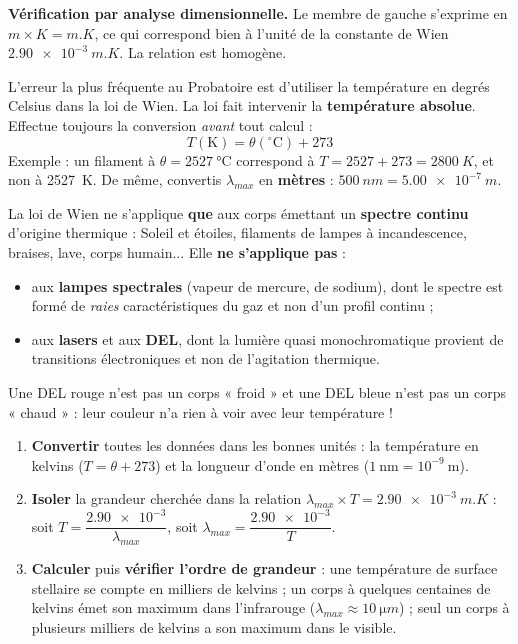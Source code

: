 \documentclass[11pt]{article}
\newcounter{popsec}
\newcounter{popsub}
\newcommand{\courssub}[1]{%
  \stepcounter{popsub}%
  \par\vspace{9pt}\noindent{\popxbold\fontsize{11.5}{13}\selectfont\color{popink}{\color{poporange}\thepopsec.\thepopsub}\hspace{6pt}#1}\par\nopagebreak\vspace{4pt}
}
\begin{document}
\textbf{Vérification par analyse dimensionnelle.} Le membre de gauche s'exprime en $\si{m} \times \si{K} = \si{m.K}$, ce qui correspond bien à l'unité de la constante de Wien $\num{2,90e-3}\ \si{m.K}$. La relation est homogène.

\begin{attention}
L'erreur la plus fréquente au Probatoire est d'utiliser la température en degrés Celsius dans la loi de Wien. La loi fait intervenir la \textbf{température absolue}. Effectue toujours la conversion \emph{avant} tout calcul :
\[ T(\text{K}) = \theta(^\circ\text{C}) + 273 \]
Exemple : un filament à $\theta = \SI{2527}{\celsius}$ correspond à $T = 2527 + 273 = \SI{2800}{K}$, et non à \SI{2527}{K}. De même, convertis $\lambda_{max}$ en \textbf{mètres} : $\SI{500}{nm} = \num{5,00e-7}\ \si{m}$.
\end{attention}

\begin{attention}
La loi de Wien ne s'applique \textbf{que} aux corps émettant un \textbf{spectre continu} d'origine thermique : Soleil et étoiles, filaments de lampes à incandescence, braises, lave, corps humain... Elle \textbf{ne s'applique pas} :
\begin{itemize}
\item aux \textbf{lampes spectrales} (vapeur de mercure, de sodium), dont le spectre est formé de \emph{raies} caractéristiques du gaz et non d'un profil continu ;
\item aux \textbf{lasers} et aux \textbf{DEL}, dont la lumière quasi monochromatique provient de transitions électroniques et non de l'agitation thermique.
\end{itemize}
Une DEL rouge n'est pas un corps « froid » et une DEL bleue n'est pas un corps « chaud » : leur couleur n'a rien à voir avec leur température !
\end{attention}

\courssub{Exploitation de la loi de Wien}

\begin{methode}
\begin{enumerate}
\item \textbf{Convertir} toutes les données dans les bonnes unités : la température en kelvins ($T = \theta + 273$) et la longueur d'onde en mètres ($1\ \text{nm} = 10^{-9}\ \text{m}$).
\item \textbf{Isoler} la grandeur cherchée dans la relation $\lambda_{max} \times T = \num{2,90e-3}\ \si{m.K}$ : soit $T = \dfrac{\num{2,90e-3}}{\lambda_{max}}$, soit $\lambda_{max} = \dfrac{\num{2,90e-3}}{T}$.
\item \textbf{Calculer} puis \textbf{vérifier l'ordre de grandeur} : une température de surface stellaire se compte en milliers de kelvins ; un corps à quelques centaines de kelvins émet son maximum dans l'infrarouge ($\lambda_{max} \approx \SI{10}{\micro m}$) ; seul un corps à plusieurs milliers de kelvins a son maximum dans le visible.
\end{enumerate}
\end{methode}
\end{document}
